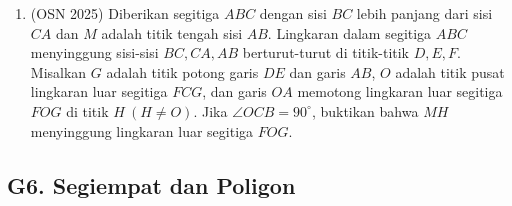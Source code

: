 \documentclass[12pt,a4paper]{article}
\begin{document}
\begin{enumerate}
\item (OSN 2025) Diberikan segitiga $ABC$ dengan sisi $BC$ lebih panjang dari sisi $CA$ dan $M$ adalah titik tengah sisi $AB$. Lingkaran dalam segitiga $ABC$ menyinggung sisi-sisi $BC, CA, AB$ berturut-turut di titik-titik $D, E, F$. Misalkan $G$ adalah titik potong garis $DE$ dan garis $AB$, $O$ adalah titik pusat lingkaran luar segitiga $FCG$, dan garis $OA$ memotong lingkaran luar segitiga $FOG$ di titik $H \ (H \ne O)$. Jika $\angle OCB = 90^{\circ}$, buktikan bahwa $MH$ menyinggung lingkaran luar segitiga $FOG$.

\end{enumerate}

\subsection{G6. Segiempat dan Poligon}
\end{document}
